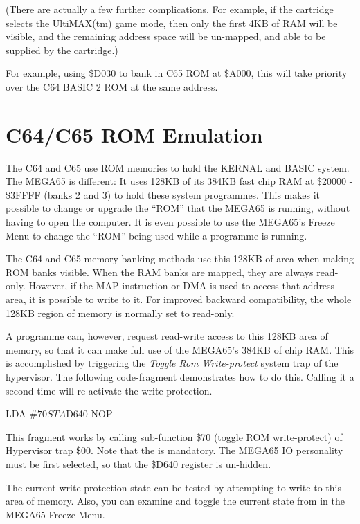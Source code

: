 (There are actually a few further complications. For example, if the
cartridge selects the UltiMAX(tm) game mode, then only the first 4KB
of RAM will be visible, and the remaining address space will be
un-mapped, and able to be supplied by the cartridge.)

For example, using \$D030 to bank in C65
ROM at \$A000, this will take priority over the C64 BASIC 2 ROM at the
same address.

\section{C64/C65 ROM Emulation}

The C64 and C65 use ROM memories to hold the KERNAL and BASIC system.
The MEGA65 is different: It uses 128KB of its 384KB fast chip RAM at
\$20000 - \$3FFFF (banks 2 and 3) to
hold these system programmes. This makes it possible to change or upgrade the
``ROM'' that the MEGA65 is running, without having to open the
computer. It is even possible to use the MEGA65's Freeze Menu to
change the ``ROM'' being used while a programme is running.

The C64 and C65 memory banking methods use this 128KB of area when
making ROM banks visible.  When the RAM banks are mapped, they are
always read-only.  However, if the MAP instruction or DMA is used to
access that address area, it is possible to write to it. For improved
backward compatibility, the whole 128KB region of memory is normally
set to read-only.

A programme can, however, request read-write access to this
128KB area of memory, so that it can make full use of the MEGA65's
384KB of chip RAM.  This is accomplished by triggering the {\em Toggle
  Rom Write-protect} system trap of the hypervisor.  The following
code-fragment demonstrates how to do this. Calling it a second time
will re-activate the write-protection.

\begin{screenoutput}
  LDA #$70
  STA $D640
  NOP
\end{screenoutput}

This fragment works by
calling sub-function \$70 (toggle ROM write-protect) of Hypervisor
trap \$00. Note that the  is mandatory. The MEGA65
IO personality must be first selected, so that the \$D640 register is
un-hidden.

The current write-protection
state can be tested by attempting to write to this area of memory.
Also, you can examine and toggle the current state from in the MEGA65
Freeze Menu.

